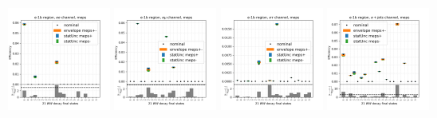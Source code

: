 \begin{figure}
    \includegraphics[width=0.24\textwidth]{appendices/ttSystReweighting/figures/afterCorr/icata2_ch0_meps.png}
    \includegraphics[width=0.24\textwidth]{appendices/ttSystReweighting/figures/afterCorr/icata2_ch1_meps.png}
    \includegraphics[width=0.24\textwidth]{appendices/ttSystReweighting/figures/afterCorr/icata2_ch2_meps.png}
    \includegraphics[width=0.24\textwidth]{appendices/ttSystReweighting/figures/afterCorr/icata2_ch3_meps.png}


\end{figure}
